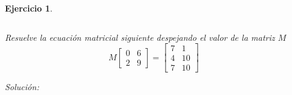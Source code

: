 \documentclass[12pt]{amsart}
\newtheorem{ejer}{Ejercicio}
\begin{document}
\begin{ejer}
\begin{minipage}{\textwidth}
\begin{tcolorbox}[colback = blue!20!white,title=Versión Sistema Matricial]
\[\]\end{tcolorbox}
\end{minipage} \newline
\noindent\begin{minipage}{\textwidth} 
\begin{tcolorbox}[colback = red!20!white,title=Versión Ecuación Matricial]
Resuelve la ecuación matricial siguiente despejando el valor de la matriz $M$
\[M \left[\begin{array}{rr}
0 & 6 \\
2 & 9
\end{array}\right] = \left[\begin{array}{rr}
7 & 1 \\
4 & 10 \\
7 & 10
\end{array}\right] \quad 
\]
\end{tcolorbox}
\end{minipage}%
\end{ejer}


{\it Soluci\'on:}

\end{document}
